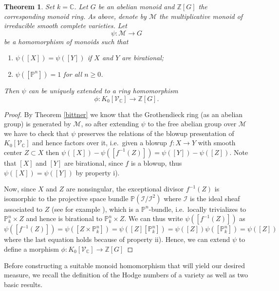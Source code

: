 \documentclass[11pt, a4paper, english, twoside]{article}
\theoremstyle{plain}
\newtheorem{theorem}{Theorem}[section]
\theoremstyle{definition}
\newcommand{\gring}[1][k]{K_0[\mathcal{V}_#1]}
\begin{document}
\begin{theorem}
    \label{th1}
    Set $k = \mathbb{C}$. Let $G$ be an abelian monoid and $\mathbb{Z}[G]$ the corresponding monoid ring. As above, denote
    by $\mathcal{M}$ the multiplicative monoid of irreducible smooth complete varieties. Let
    \[
        \psi \colon \mathcal{M} \to G
    \]
    be a homomorphism of monoids such that
    \begin{enumerate}[label=\rm{\roman*)}]
        \item $\psi([X]) = \psi([Y])$ if $X$ and $Y$ are birational;
        \item $\psi([\mathbb{P}^n]) = 1$ for all $n \ge 0$.
    \end{enumerate}
    Then $\psi$ can be uniquely extended to a ring homomorphism 
    \[
        \phi \colon \gring[\mathbb{C}] \to \mathbb{Z} [G].
    \]
\end{theorem}
\begin{proof}
    By Theorem \ref{bittner} we know that the Grothendieck ring (as an abelian group) is generated by $\mathcal{M}$, so after extending $\psi$ to
    the free abelian group over $\mathcal{M}$ 
    we have to check that $\psi$ preserves the relations of the blowup presentation of $\gring[\mathbb{C}]$ and hence factors over it,
    i.e.\ given a blowup $f \colon X \to Y$ with smooth center $Z \subset X$ then $\psi([X]) - \psi([f^{-1}(Z)]) = \psi([Y]) - \psi([Z])$. 
    Note that $[X]$ and $[Y]$ are birational, since $f$ is a blowup, thus $\psi([X]) = \psi([Y])$ by property i).
    
    Now, since $X$ and $Z$ are nonsingular, the exceptional divisor $f^{-1}(Z)$ is isomorphic to 
    the projective space bundle  $\mathbb{P}(\mathcal{I}/\mathcal{I}^2)$ 
    where $\mathcal{I}$ is the ideal sheaf associated to $Z$ (see for example \cite[II.8, Thm 8.24]{Ha}),
    which is a $\mathbb{P}^n$-bundle, i.e.\ locally trivializes to $\mathbb{P}_k^n \times Z$
    and hence is birational to $\mathbb{P}_k^n \times Z$. 
    We can thus write $\psi([f^{-1}(Z)])$ as  
    \[
        \psi([f^{-1}(Z)]) = \psi([Z \times \mathbb{P}_k^n]) = \psi([Z][\mathbb{P}_k^n]) = \psi([Z])\psi([\mathbb{P}_k^n]) = \psi([Z])
    \]
    where the last equation holds because of property ii).
    Hence, we can extend $\psi$ to define a morphism $\phi \colon \gring[\mathbb{C}] \to \mathbb{Z} [G]$
\end{proof}

Before constructing a suitable monoid homomorphism that will yield our desired measure, we recall the definition of the Hodge numbers
of a variety as well as two basic results.
\end{document}
